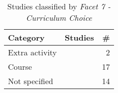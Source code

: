 
\begin{table}[htb]
	\centering
	\caption{Studies classified by \it Facet 7 - Curriculum Choice}
		{\begin{tabular}{l|p{2.0in}|r }
			\bf Category & \bf Studies & \bf \# \\
			\hline
			Extra activity & \citep{id5329, id5335} & 2 \\
			Course & \citep{id17882, id0135, id5343, id5353, id17796, id5357, id0093, id1088, id4503, id4663, id4811, id4815, id5676, id17805, id17830, id17845, id18433} & 17 \\
			Not specified & \citep{id0089, id5546, id0115, id17800, id0134, id0098, id0106, id1097, id1192, id1193, id4966, id5147, id18359, id5328} & 14 \\
		\end{tabular}} 	\label{tab:approachCurriculumStudies}
\end{table}
